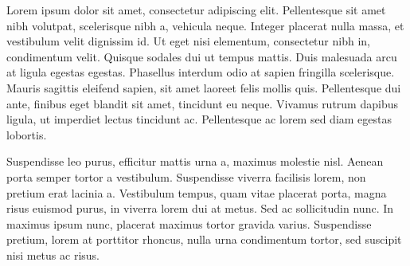 Lorem ipsum dolor sit amet, consectetur adipiscing elit. Pellentesque sit amet nibh volutpat, scelerisque nibh a, vehicula neque. Integer placerat nulla massa, et vestibulum velit dignissim id. Ut eget nisi elementum, consectetur nibh in, condimentum velit. Quisque sodales dui ut tempus mattis. Duis malesuada arcu at ligula egestas egestas. Phasellus interdum odio at sapien fringilla scelerisque. Mauris sagittis eleifend sapien, sit amet laoreet felis mollis quis. Pellentesque dui ante, finibus eget blandit sit amet, tincidunt eu neque. Vivamus rutrum dapibus ligula, ut imperdiet lectus tincidunt ac. Pellentesque ac lorem sed diam egestas lobortis.

Suspendisse leo purus, efficitur mattis urna a, maximus molestie nisl. Aenean porta semper tortor a vestibulum. Suspendisse viverra facilisis lorem, non pretium erat lacinia a. Vestibulum tempus, quam vitae placerat porta, magna risus euismod purus, in viverra lorem dui at metus. Sed ac sollicitudin nunc. In maximus ipsum nunc, placerat maximus tortor gravida varius. Suspendisse pretium, lorem at porttitor rhoncus, nulla urna condimentum tortor, sed suscipit nisi metus ac risus.

